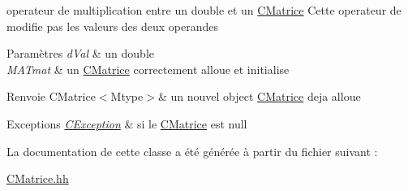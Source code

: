 operateur de multiplication entre un double et un \hyperlink{classCMatrice}{C\+Matrice} Cette operateur de modifie pas les valeurs des deux operandes 


\begin{DoxyParams}{Paramètres}
{\em d\+Val} & un double \\
\hline
{\em M\+A\+Tmat} & un \hyperlink{classCMatrice}{C\+Matrice} correctement alloue et initialise \\
\hline
\end{DoxyParams}
\begin{DoxyReturn}{Renvoie}
C\+Matrice$<$\+Mtype$>$\& un nouvel object \hyperlink{classCMatrice}{C\+Matrice} deja alloue 
\end{DoxyReturn}

\begin{DoxyExceptions}{Exceptions}
{\em \hyperlink{classCException}{C\+Exception}} & si le \hyperlink{classCMatrice}{C\+Matrice} est null \\
\hline
\end{DoxyExceptions}


La documentation de cette classe a été générée à partir du fichier suivant \+:\begin{DoxyCompactItemize}
\item 
\hyperlink{CMatrice_8hh}{C\+Matrice.\+hh}\end{DoxyCompactItemize}
